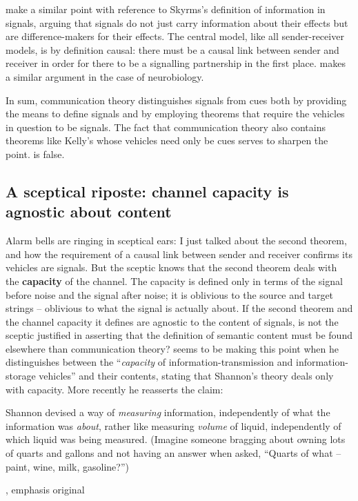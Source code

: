 \documentclass[12pt]{article}
\begin{document}
\citet{calcott2020signals} make a similar point with reference to Skyrms's \citeyearpar{skyrms2010signals} definition of information in signals, arguing that signals do not just carry information about their effects but are difference-makers for their effects.
The central model, like all sender-receiver models, is by definition causal: there must be a causal link between sender and receiver in order for there to be a signalling partnership in the first place.
\citet{rathkopf2017neural} makes a similar argument in the case of neurobiology.

In sum, communication theory distinguishes signals from cues both by providing the means to define signals and by employing theorems that require the vehicles in question to be signals.
The fact that communication theory also contains theorems like Kelly's whose vehicles need only be cues serves to sharpen the point.
\act{} is false.

\subsection{A sceptical riposte: channel capacity is agnostic about content}

Alarm bells are ringing in sceptical ears: I just talked about the second theorem, and how the requirement of a causal link between sender and receiver confirms its vehicles are signals.
But the sceptic knows that the second theorem deals with the \textbf{capacity} of the channel.
The capacity is defined only in terms of the signal before noise and the signal after noise; it is oblivious to the source and target strings -- oblivious to what the signal is actually about.
If the second theorem and the channel capacity it defines are agnostic to the content of signals, is not the sceptic justified in asserting that the definition of semantic content must be found elsewhere than communication theory?
\citet[344]{dennett1983intentional} seems to be making this point when he distinguishes between the ``\textit{capacity} of information-transmission and information-storage vehicles'' and their contents, stating that Shannon's theory deals only with capacity.
More recently he reasserts the claim:

\begin{myquote}
Shannon devised a way of \textit{measuring} information, independently of what the information was \textit{about}, rather like measuring \textit{volume} of liquid, independently of which liquid was being measured. (Imagine someone bragging about owning lots of quarts and gallons and not having an answer when asked, ``Quarts of what -- paint, wine, milk, gasoline?'')
\par\hspace*{\fill}\citet[106]{dennett2017bacteria}, emphasis original
\end{myquote}
\end{document}
